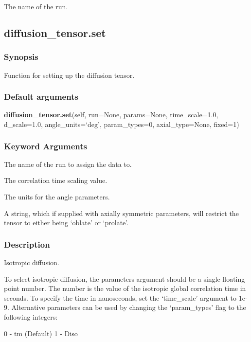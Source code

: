   The name of the run.


\newpage

\subsection{diffusion\_tensor.set}


\subsubsection{Synopsis}

Function for setting up the diffusion tensor.

\subsubsection{Default arguments}

\textsf{\textbf{diffusion\_tensor.set}(self, run=None, params=None, time\_scale=1.0, d\_scale=1.0, angle\_units=`deg', param\_types=0, axial\_type=None, fixed=1)}


\subsubsection{Keyword Arguments}

  The name of the run to assign the data to.

  The correlation time scaling value.

  The units for the angle parameters.

  A string, which if supplied with axially symmetric parameters, will restrict the tensor to either being `oblate' or `prolate'.


\subsubsection{Description}

Isotropic diffusion.

To select isotropic diffusion, the parameters argument should be a single floating point
number.  The number is the value of the isotropic global correlation time in seconds.  To
specify the time in nanoseconds, set the `time\_scale' argument to 1e-9.  Alternative
parameters can be used by changing the `param\_types' flag to the following integers:

    0 - tm   (Default)
    1 - Diso

